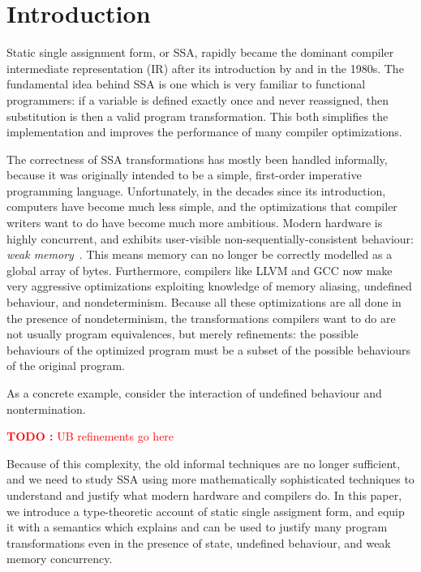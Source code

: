 \documentclass[acmsmall,screen,review]{acmart}
\newcounter{todos}
\newcommand{\TODO}[1]{{
  \stepcounter{todos}
  \begin{center}\large{\textcolor{red}{\textbf{TODO \arabic{todos}:} #1}}\end{center}
}}
\begin{document}

\maketitle

\section{Introduction}

Static single assignment form, or SSA, rapidly became the dominant compiler intermediate
representation (IR) after its introduction by \citet{alpern-ssa-original-88} and
\citet{rosen-gvn-1988} in the 1980s. The fundamental idea behind SSA is one which is very familiar
to functional programmers: if a variable is defined exactly once and never reassigned, then
substitution is then a valid program transformation. This both simplifies the implementation and
improves the performance of many compiler optimizations.

The correctness of SSA transformations has mostly been handled informally, because it was originally
intended to be a simple, first-order imperative programming language. Unfortunately, in the decades
since its introduction, computers have become much less simple, and the optimizations that compiler
writers want to do have become much more ambitious. Modern hardware is highly concurrent, and
exhibits user-visible non-sequentially-consistent behaviour: \emph{weak
memory}~\cite{batty-compositional-17}. This means memory can no longer be correctly modelled as a
global array of bytes. Furthermore, compilers like LLVM and GCC now make very aggressive
optimizations exploiting knowledge of memory aliasing, undefined behaviour, and nondeterminism.
Because all these optimizations are all done in the presence of nondeterminism, the transformations
compilers want to do are not usually program equivalences, but merely refinements: the possible
behaviours of the optimized program must be a subset of the possible behaviours of the original
program.

As a concrete example, consider the interaction of undefined behaviour and nontermination. 

\TODO{UB refinements go here}

Because of this complexity, the old informal techniques are no longer sufficient, and we need to
study SSA using more mathematically sophisticated techniques to understand and justify what modern
hardware and compilers do. In this paper, we introduce a type-theoretic account of static single
assigment form, and equip it with a semantics which explains and can be used to justify many program
transformations even in the presence of state, undefined behaviour, and weak memory concurrency. 
\end{document}
